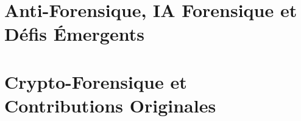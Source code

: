 \documentclass[12pt, twoside, openright, a4paper]{book}
\begin{document}
    \part{Anti-Forensique, IA Forensique et Défis Émergents}
    \label{part:avance}

        
   
        
      
        
    
        
    
    \part{Crypto-Forensique et Contributions Originales}
    \label{part:crypto}

        
    
        
    
        
     
        
    
        
    
        
     
        
     

\appendix

    

    

    
\end{document}
